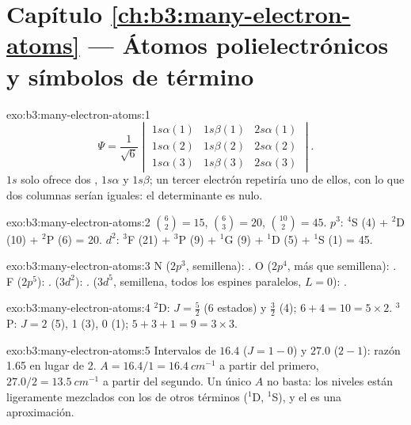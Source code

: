 \section*{Capítulo \ref{ch:b3:many-electron-atoms} --- Átomos polielectrónicos y símbolos de término}

\begin{solution}{exo:b3:many-electron-atoms:1}
\[
\Psi = \frac{1}{\sqrt6}\begin{vmatrix}1s\alpha(1) & 1s\beta(1) & 2s\alpha(1)\\
1s\alpha(2) & 1s\beta(2) & 2s\alpha(2)\\ 1s\alpha(3) & 1s\beta(3) & 2s\alpha(3)
\end{vmatrix}.
\]
$1s$ solo ofrece dos , $1s\alpha$ y $1s\beta$; un tercer electrón
repetiría uno de ellos, con lo que dos columnas serían iguales: el determinante es nulo.
\end{solution}

\begin{solution}{exo:b3:many-electron-atoms:2}
$\binom62 = 15$, $\binom63 = 20$, $\binom{10}{2} = 45$. $p^3$: ${}^4$S (4) +
${}^2$D (10) + ${}^2$P (6) = 20. $d^2$: ${}^3$F (21) + ${}^3$P (9) + ${}^1$G (9) +
${}^1$D (5) + ${}^1$S (1) = 45.
\end{solution}

\begin{solution}{exo:b3:many-electron-atoms:3}
N ($2p^3$, semillena): . O ($2p^4$, más que semillena):
. F ($2p^5$): .  ($3d^2$):
.  ($3d^5$, semillena, todos los espines paralelos, $L = 0$):
.
\end{solution}

\begin{solution}{exo:b3:many-electron-atoms:4}
${}^2$D: $J = \frac52$ (6 estados) y $\frac32$ (4); $6 + 4 = 10 = 5 \times 2$.
${}^3$P: $J = 2$ (5), 1 (3), 0 (1); $5 + 3 + 1 = 9 = 3 \times 3$.
\end{solution}

\begin{solution}{exo:b3:many-electron-atoms:5}
Intervalos de $16.4$ ($J = 1 - 0$) y $27.0$ ($2 - 1$): razón 1.65 en lugar de 2.
$A = 16.4/1 = \qty{16.4}{cm^{-1}}$ a partir del primero, $27.0/2 = \qty{13.5}{cm^{-1}}$
a partir del segundo. Un único $A$ no basta: los niveles están ligeramente mezclados con
los de otros términos (${}^1$D, ${}^1$S), y el  es una
aproximación.
\end{solution}

